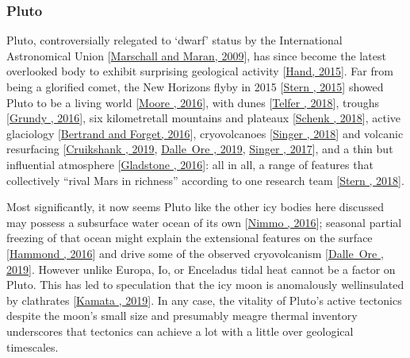 \documentclass[letterpaper,10pt,english]{jupyterBook}
\begin{document}
\subsubsection{Pluto}
\label{\detokenize{content/chapter_01_background/main:pluto}}
\sphinxAtStartPar
Pluto, controversially relegated to ‘dwarf’ status by the International Astronomical Union {[}\hyperlink{cite.references:id615}{Marschall and Maran, 2009}{]}, has since become the latest overlooked body to exhibit surprising geological activity {[}\hyperlink{cite.references:id622}{Hand, 2015}{]}. Far from being a glorified comet, the New Horizons flyby in 2015 {[}\hyperlink{cite.references:id609}{Stern , 2015}{]} showed Pluto to be a living world {[}\hyperlink{cite.references:id611}{Moore , 2016}{]}, with dunes {[}\hyperlink{cite.references:id612}{Telfer , 2018}{]}, troughs {[}\hyperlink{cite.references:id614}{Grundy , 2016}{]}, six kilometre\sphinxhyphen{}tall mountains and plateaux {[}\hyperlink{cite.references:id627}{Schenk , 2018}{]}, active glaciology {[}\hyperlink{cite.references:id616}{Bertrand and Forget, 2016}{]}, cryovolcanoes {[}\hyperlink{cite.references:id742}{Singer , 2018}{]} and volcanic resurfacing {[}\hyperlink{cite.references:id623}{Cruikshank , 2019}, \hyperlink{cite.references:id466}{Dalle Ore , 2019}, \hyperlink{cite.references:id617}{Singer , 2017}{]}, and a thin but influential atmosphere {[}\hyperlink{cite.references:id613}{Gladstone , 2016}{]}: all in all, a range of features that collectively “rival Mars in richness” according to one research team {[}\hyperlink{cite.references:id610}{Stern , 2018}{]}.

\sphinxAtStartPar
Most significantly, it now seems Pluto \sphinxhyphen{} like the other icy bodies here discussed \sphinxhyphen{} may possess a subsurface water ocean of its own {[}\hyperlink{cite.references:id618}{Nimmo , 2016}{]}; seasonal partial freezing of that ocean might explain the extensional features on the surface {[}\hyperlink{cite.references:id498}{Hammond , 2016}{]} and drive some of the observed cryovolcanism {[}\hyperlink{cite.references:id466}{Dalle Ore , 2019}{]}. However \sphinxhyphen{} unlike Europa, Io, or Enceladus \sphinxhyphen{} tidal heat cannot be a factor on Pluto. This has led to speculation that the icy moon is anomalously well\sphinxhyphen{}insulated by clathrates {[}\hyperlink{cite.references:id621}{Kamata , 2019}{]}. In any case, the vitality of Pluto’s active tectonics despite the moon’s small size and presumably meagre thermal inventory underscores that tectonics can achieve a lot with a little over geological timescales.
\end{document}
